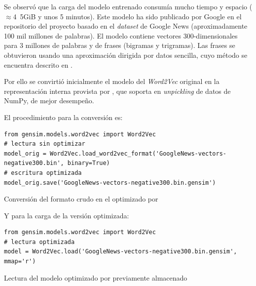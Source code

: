 Se observó que la carga del modelo entrenado  consumía mucho tiempo y espacio ($\approx$\si{4.5}{GiB} y unos 5 minutos). Este modelo ha sido publicado por Google en el repositorio del proyecto  basado en el \emph{dataset} de Google News (aproximadamente 100 mil millones de palabras). El modelo contiene vectores 300-dimensionales para 3 millones de palabras y de frases (bigramas y trigramas). Las frases se obtuvieron usando una aproximación dirigida por datos sencilla, cuyo método se encuentra descrito en \cite{DBLP:journals/corr/MikolovSCCD13}.

Por ello se convirtió inicialmente el modelo del \emph{Word2Vec} original en la representación interna provista por , que soporta en \emph{unpickling} de datos de NumPy, de mejor desempeño.

El procedimiento para la conversión es:
\nopagebreak
\begin{listing}[H]
\begin{verbatim}
from gensim.models.word2vec import Word2Vec
# lectura sin optimizar
model_orig = Word2Vec.load_word2vec_format('GoogleNews-vectors-negative300.bin', binary=True)
# escritura optimizada
model_orig.save('GoogleNews-vectors-negative300.bin.gensim')
\end{verbatim}
\caption{Conversión del formato crudo  en el optimizado por }
\label{lst:word2vec-convert}
\end{listing}

Y para la carga de la versión optimizada:
\nopagebreak
\begin{listing}[H]
\begin{verbatim}
from gensim.models.word2vec import Word2Vec
# lectura optimizada
model = Word2Vec.load('GoogleNews-vectors-negative300.bin.gensim', mmap='r')
\end{verbatim}
\caption{Lectura del modelo optimizado por  previamente almacenado}
\label{lst:word2vec-load}
\end{listing}
